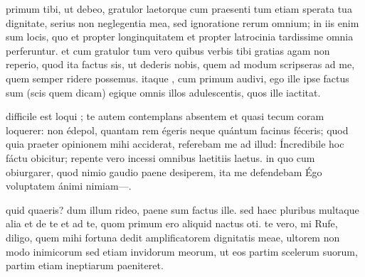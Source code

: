 


 primum tibi, ut debeo, gratulor laetorque cum praesenti tum etiam sperata tua dignitate, serius non neglegentia mea, sed ignoratione rerum omnium; in iis enim sum locis, quo et propter longinquitatem et propter latrocinia tardissime omnia perferuntur. et cum gratulor tum vero quibus verbis tibi gratias agam non reperio, quod ita factus sis, ut dederis nobis, quem ad modum scripseras ad me, quem semper ridere possemus. itaque , cum primum audivi, ego ille ipse factus sum (scis quem dicam) egique omnis illos adulescentis, quos ille iactitat.

 difficile est loqui ; te autem contemplans absentem et quasi tecum coram loquerer: non édepol, quantam rem égeris neque quántum facinus féceris; quod quia praeter opinionem mihi acciderat, referebam me ad illud: Íncredibile hoc fáctu obicitur; repente vero incessi omnibus laetitiis laetus. in quo cum obiurgarer, quod nimio gaudio paene desiperem, ita me defendebam Égo voluptatem ánimi nimiam—.

 quid quaeris? dum illum rideo, paene sum factus ille. sed haec pluribus multaque alia et de te et ad te, quom primum ero aliquid nactus oti. te vero, mi Rufe, diligo, quem mihi fortuna dedit amplificatorem dignitatis meae, ultorem non modo inimicorum sed etiam invidorum meorum, ut eos partim scelerum suorum, partim etiam ineptiarum paeniteret.
